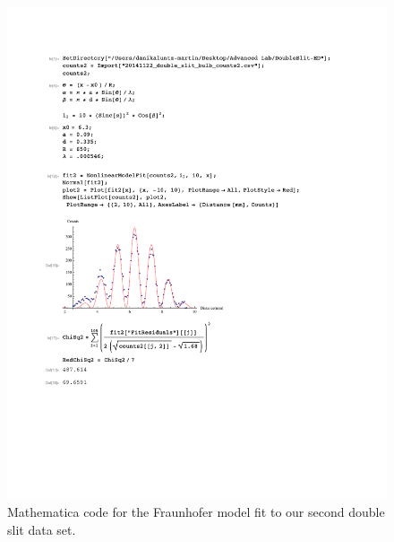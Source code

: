 \documentclass[prb,preprint]{revtex4-1}
\begin{document}
\begin{figure}[h!]
\centering
\includegraphics[width=6in]{DoubleSlitFraun2.pdf}
\caption{Mathematica code for the Fraunhofer model fit to our second double slit data set.}
\label{DoubleSlitFraun2}
\end{figure}
\end{document}
